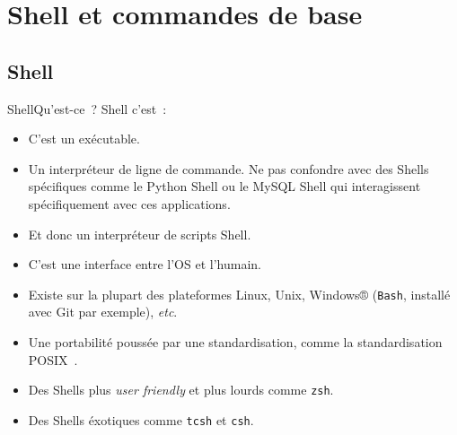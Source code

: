 \documentclass{beamer}
\begin{document}
    \section{Shell et commandes de base}\label{sec:shell-and-command}

    \subsection{Shell}\label{subsec:shell}

    \begin{frame}{Shell}{Qu'est-ce~?}
        Shell c'est~:
        \begin{itemize}
            \item C'est un exécutable.
            \item Un interpréteur de ligne de commande.
            Ne pas confondre avec des Shells spécifiques comme le Python Shell ou le MySQL Shell qui interagissent spécifiquement avec ces applications.
            \item Et donc un interpréteur de scripts Shell.
            \item C'est une interface entre l'OS et l'humain.
            \item Existe sur la plupart des plateformes Linux, Unix, Windows® (\lstinline{Bash}, installé avec Git par exemple), \textit{etc}.
            \item Une portabilité poussée par une standardisation, comme la standardisation POSIX~.
            \item Des Shells plus \textit{user friendly} et plus lourds comme \lstinline{zsh}.
            \item Des Shells éxotiques comme \lstinline{tcsh} et \lstinline{csh}.
        \end{itemize}
    \end{frame}
\end{document}

